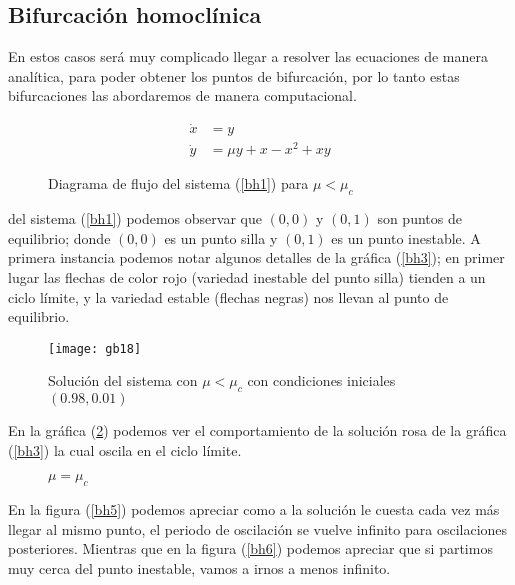 \subsection{Bifurcación homoclínica}
En estos casos será muy complicado llegar a resolver las ecuaciones de manera analítica, para poder obtener los puntos de bifurcación, por lo tanto estas bifurcaciones las abordaremos de manera computacional.
\begin{ejemplo}
  \begin{equation}
    \label{bh1} 
    \begin{split}
      \dot{x} &= y \\
      \dot{y} &= \mu y + x - x^2 + xy 
    \end{split}
  \end{equation}
  \begin{figure}[H]
   \centering
    \subfloat[]{
     \label{}
      \texttt{[image: gb16]}}
    \subfloat[]{
     \label{bh3}
      \texttt{[image: gb17]}}
      \caption{Diagrama de flujo del sistema (\ref{bh1}) para $ \mu< \mu_c$ }
   \label{}
  \end{figure} 
  del sistema (\ref{bh1}) podemos observar que $(0,0)$ y $(0,1)$ son puntos de equilibrio; donde $(0,0)$ es un punto silla y  $(0,1)$ es un punto inestable. A primera instancia podemos notar algunos detalles de la gráfica (\ref{bh3}); en primer lugar las flechas de color rojo (variedad inestable del punto silla) tienden a un ciclo límite, y la variedad estable (flechas negras) nos llevan al punto de equilibrio.
  \begin{figure}[H]   
    \centering
    \texttt{[image: gb18]}
    \caption{Solución del sistema con $ \mu<\mu_c$ con condiciones iniciales $(0.98,0.01)$} 
    \label{bh4}
  \end{figure}
  En la gráfica (\ref{bh4}) podemos ver el comportamiento de la solución rosa de la gráfica (\ref{bh3}) la cual oscila en el ciclo límite.
  \begin{figure}[H]
   \centering
      \caption{$ \mu=\mu_c$}
  \end{figure} 
  En la figura (\ref{bh5}) podemos apreciar como a la solución le cuesta cada vez más llegar al mismo punto, el periodo de oscilación se vuelve infinito para oscilaciones posteriores. Mientras que en la figura (\ref{bh6}) podemos apreciar que si partimos muy cerca del punto inestable, vamos a irnos a menos infinito. 

\end{ejemplo}
